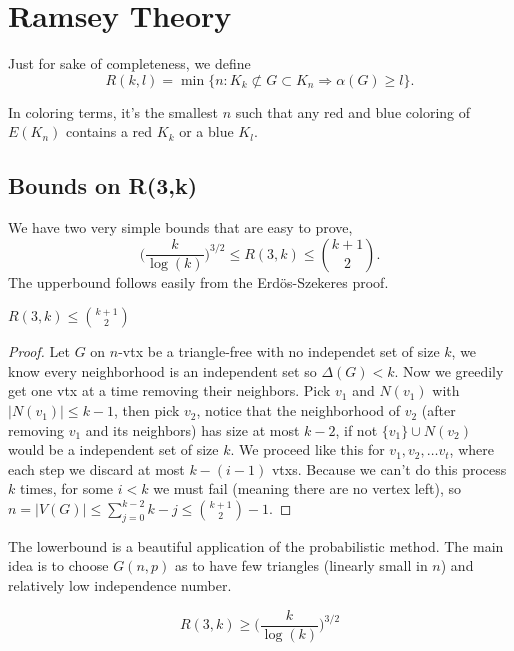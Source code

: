 \section{Ramsey Theory}
Just for sake of completeness, we define
\[
	R(k,l) = \min\{ n : K_k \not \subset G \subset K_n \Rightarrow
	\alpha(G) \geq l \}.
\]

In coloring terms, it's the smallest $n$ such that any red and blue
coloring of $E(K_n)$ contains a red $K_k$ or a blue $K_l$.

\subsection{Bounds on \mbox{R(3,k)}}
We have two very simple bounds that are easy to prove,
\[
	\bigg(\frac{k}{\log(k)}\bigg)^{3/2} \leq R(3,k) \leq \binom{k+1}{2}.
\]
The upperbound follows easily from the Erdös-Szekeres proof.
\begin{theorem}
	$R(3,k) \leq \binom{k+1}{2}$
\end{theorem}
\begin{proof}

	Let $G$ on $n$-vtx be a triangle-free with no independet set of size $k$,
	we know every neighborhood is an independent set so $\Delta(G) < k$.
	Now we greedily get one vtx at a time removing their neighbors.
	Pick $v_1$ and $N(v_1)$ with $|N(v_1)| \leq k-1$, then pick $v_2$,
	notice that the neighborhood of $v_2$ (after removing $v_1$ and its neighbors)
	has size at most $k-2$, if not $\{v_1\} \cup N(v_2)$ would be a
	independent set of size $k$. We proceed like this for $v_1, v_2, \dots v_t$,
	where each step we discard at most $k-(i-1)$ vtxs. Because we can't do this
	process $k$ times, for some $i < k$ we must fail (meaning there are
	no vertex left),
	so $n = |V(G)| \leq \sum_{j=0}^{k-2} k - j \leq \binom{k+1}{2} - 1$.
\end{proof}

The lowerbound is a beautiful application of the probabilistic
method. The main idea is to choose $G(n,p)$
as to have few triangles (linearly small in $n$) and relatively low
independence number.

\begin{theorem}
	\[
		R(3,k) \geq \bigg(\frac{k}{\log(k)}\bigg)^{3/2}
	\]
\end{theorem}

